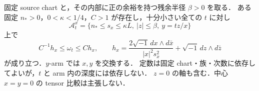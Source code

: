 \begin{proposition}
\label{ke:source-arm-uniform-tensor}
固定 source chart と，その内部に正の余裕を持つ残余半径 $\beta>0$ を取る．
ある固定 $n_*>0$，$0<\kappa<1/4$，$C>1$ が存在し，十分小さい全ての $t$ に対し
\[
 \mathcal A^x_t
 =\{n_*\le s_x\le\kappa L,\ |z|\le\beta,\ y=tz/x\}
\]
上で
\begin{equation}\label{ke:eq:source-arm-uniform-tensor}
 C^{-1}h_x\le\omega_t\le C h_x,\qquad
 h_x=\frac{2\sqrt{-1}\,dx\wedge d\bar x}{|x|^2s_x^2}
                   +\sqrt{-1}\,dz\wedge d\bar z
\end{equation}
が成り立つ．$y$-arm では $x,y$ を交換する．
定数は固定 chart・族・次数に依存してよいが，$t$ と arm 内の深度には依存しない．
$z=0$ の軸も含む．中心 $x=y=0$ の tensor 比較は主張しない．
\end{proposition}

